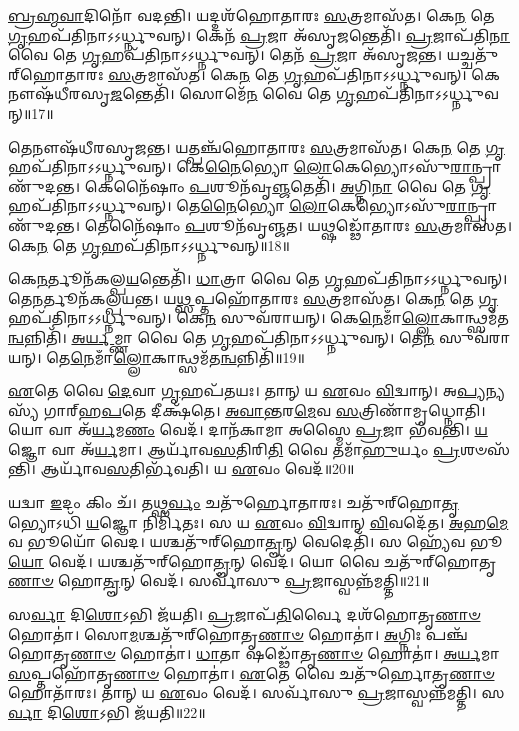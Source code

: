 \-\ul{𑌬𑍍𑌰}\-\-\ul{𑌹𑍍𑌮}\-\-\ul{𑌵𑌾}\-𑌦𑌿𑌨𑍋᳴ 𑌵𑌦𑌨𑍍𑌤𑌿।
𑌯𑌦𑍍𑌦𑌶᳴𑌹𑍋𑌤𑌾𑌰𑌃 \ul{𑌸}\-𑌤𑍍𑌰𑌮𑌾𑌸᳴𑌤।
𑌕𑍇\-\ul{𑌨} 𑌤𑍇 \ul{𑌗𑍃}\-𑌹𑌪᳴𑌤𑌿𑌨𑌾\-𑌽𑌽𑌰𑍍𑌧𑍍𑌨𑍁𑌵𑌨𑍍।
𑌕𑍇𑌨᳴ \ul{𑌪𑍍𑌰}\-𑌜𑌾 𑌅᳴𑌸𑍃\-\ul{𑌜}\-𑌨𑍍𑌤𑍇𑌤𑌿᳴।
\-\ul{𑌪𑍍𑌰}\-𑌜𑌾𑌪᳴𑌤𑌿\-\ul{𑌨𑌾} 𑌵𑍈 𑌤𑍇 \ul{𑌗𑍃}\-𑌹𑌪᳴𑌤𑌿𑌨𑌾\-𑌽𑌽𑌰𑍍𑌧𑍍𑌨𑍁𑌵𑌨𑍍।
𑌤𑍇𑌨᳴ \ul{𑌪𑍍𑌰}\-𑌜𑌾 𑌅᳴𑌸𑍃𑌜𑌨𑍍𑌤।
𑌯𑌚𑍍𑌚𑌤𑍁᳴𑌰𑍍‌\mbox{}𑌹𑍋𑌤𑌾𑌰𑌃 \ul{𑌸}\-𑌤𑍍𑌰𑌮𑌾𑌸᳴𑌤।
𑌕𑍇\-\ul{𑌨} 𑌤𑍇 \ul{𑌗𑍃}\-𑌹𑌪᳴𑌤𑌿𑌨𑌾\-𑌽𑌽𑌰𑍍𑌧𑍍𑌨𑍁𑌵𑌨𑍍।
𑌕𑍇𑌨𑍗𑌷᳴𑌧𑍀𑌰𑌸𑍃\-\ul{𑌜}\-𑌨𑍍𑌤𑍇𑌤𑌿᳴।
𑌸𑍋𑌮𑍇᳴\-\ul{𑌨} 𑌵𑍈 𑌤𑍇 \ul{𑌗𑍃}\-𑌹𑌪᳴𑌤𑌿𑌨𑌾\-𑌽𑌽𑌰𑍍𑌧𑍍𑌨𑍁𑌵𑌨𑍍॥17॥

𑌤𑍇𑌨𑍗𑌷᳴𑌧𑍀𑌰𑌸𑍃𑌜𑌨𑍍𑌤।
𑌯𑌤𑍍𑌪𑌞𑍍𑌚᳴𑌹𑍋𑌤𑌾𑌰𑌃 \ul{𑌸}\-𑌤𑍍𑌰𑌮𑌾𑌸᳴𑌤।
𑌕𑍇\-\ul{𑌨} 𑌤𑍇 \ul{𑌗𑍃}\-𑌹𑌪᳴𑌤𑌿𑌨𑌾\-𑌽𑌽𑌰𑍍𑌧𑍍𑌨𑍁𑌵𑌨𑍍।
𑌕𑍇\-\ul{𑌨𑍈}\-𑌭𑍍𑌯𑍋 \ul{𑌲𑍋}\-𑌕𑍇𑌭𑍍𑌯𑍋\-𑌽𑌸𑍁᳴\-\ul{𑌰𑌾}\-𑌨𑍍𑌪𑍍𑌰𑌾𑌣𑍁᳴𑌦𑌨𑍍𑌤।
𑌕𑍇𑌨𑍈᳴𑌷𑌾𑌂 \ul{𑌪}\-𑌶𑍂𑌨᳴𑌵𑍃\-\ul{𑌞𑍍𑌜}\-𑌤𑍇𑌤𑌿᳴।
\-\ul{𑌅}\-𑌗𑍍𑌨𑌿\-\ul{𑌨𑌾} 𑌵𑍈 𑌤𑍇 \ul{𑌗𑍃}\-𑌹𑌪᳴𑌤𑌿𑌨𑌾\-𑌽𑌽𑌰𑍍𑌧𑍍𑌨𑍁𑌵𑌨𑍍।
𑌤𑍇\-\ul{𑌨𑍈}\-𑌭𑍍𑌯𑍋 \ul{𑌲𑍋}\-𑌕𑍇𑌭𑍍𑌯𑍋\-𑌽𑌸𑍁᳴\-\ul{𑌰𑌾}\-𑌨𑍍𑌪𑍍𑌰𑌾𑌣𑍁᳴𑌦𑌨𑍍𑌤।
𑌤𑍇𑌨𑍈᳴𑌷𑌾𑌂 \ul{𑌪}\-𑌶𑍂𑌨᳴𑌵𑍃𑌞𑍍𑌜𑌤।
𑌯𑌥𑍍𑌷𑌡𑍍𑌢𑍋᳴𑌤𑌾𑌰𑌃 \ul{𑌸}\-𑌤𑍍𑌰𑌮𑌾𑌸᳴𑌤।
𑌕𑍇\-\ul{𑌨} 𑌤𑍇 \ul{𑌗𑍃}\-𑌹𑌪᳴𑌤𑌿𑌨𑌾\-𑌽𑌽𑌰𑍍𑌧𑍍𑌨𑍁𑌵𑌨𑍍॥18॥

𑌕𑍇\-\ul{𑌨}\-𑌰𑍍𑌤𑍂𑌨᳴𑌕𑌲𑍍𑌪\-\ul{𑌯}\-𑌨𑍍𑌤𑍇𑌤𑌿᳴।
\-\ul{𑌧𑌾}\-𑌤𑍍𑌰𑌾 𑌵𑍈 𑌤𑍇 \ul{𑌗𑍃}\-𑌹𑌪᳴𑌤𑌿𑌨𑌾\-𑌽𑌽𑌰𑍍𑌧𑍍𑌨𑍁𑌵𑌨𑍍।
𑌤𑍇\-\ul{𑌨}\-𑌰𑍍𑌤𑍂𑌨᳴𑌕𑌲𑍍𑌪𑌯𑌨𑍍𑌤।
𑌯\-\ul{𑌥𑍍𑌸}\-𑌪𑍍𑌤𑌹𑍋᳴𑌤𑌾𑌰𑌃 \ul{𑌸}\-𑌤𑍍𑌰𑌮𑌾𑌸᳴𑌤।
𑌕𑍇\-\ul{𑌨} 𑌤𑍇 \ul{𑌗𑍃}\-𑌹𑌪᳴𑌤𑌿𑌨𑌾\-𑌽𑌽𑌰𑍍𑌧𑍍𑌨𑍁𑌵𑌨𑍍।
𑌕𑍇\-\ul{𑌨} 𑌸𑍁𑌵᳴𑌰𑌾𑌯𑌨𑍍।
𑌕𑍇\-\ul{𑌨𑍇}\-𑌮𑌾𑌁\-\ul{𑌲𑍍𑌲𑍋}\-𑌕𑌾𑌨𑍍𑌥𑍍𑌸𑌮᳴\-𑌤\-\ul{𑌨𑍍𑌵}\-𑌨𑍍𑌨𑌿𑌤𑌿᳴।
\-\ul{𑌅}\-\-\ul{𑌰𑍍𑌯}\-𑌮𑍍𑌣𑌾 𑌵𑍈 𑌤𑍇 \ul{𑌗𑍃}\-𑌹𑌪᳴𑌤𑌿𑌨𑌾\-𑌽𑌽𑌰𑍍𑌧𑍍𑌨𑍁𑌵𑌨𑍍।
𑌤𑍇\-\ul{𑌨} 𑌸𑍁𑌵᳴𑌰𑌾𑌯𑌨𑍍।
𑌤𑍇\-\ul{𑌨𑍇}\-𑌮𑌾𑌁\-\ul{𑌲𑍍𑌲𑍋}\-𑌕𑌾𑌨𑍍𑌥𑍍𑌸𑌮᳴𑌤\-\ul{𑌨𑍍𑌵}\-𑌨𑍍𑌨𑌿𑌤𑌿᳴॥19॥

\-\ul{𑌏}\-𑌤𑍇 𑌵𑍈 \ul{𑌦𑍇}\-𑌵𑌾 \ul{𑌗𑍃}\-𑌹𑌪᳴𑌤𑌯𑌃।
𑌤𑌾𑌨𑍍 𑌯 \ul{𑌏}\-𑌵𑌂 \ul{𑌵𑌿}\-𑌦𑍍𑌵𑌾𑌨𑍍।
𑌅\-\ul{𑌪𑍍𑌯}\-𑌨𑍍𑌯𑌸𑍍𑌯᳴ 𑌗𑌾𑌰𑍍‌\mbox{}𑌹\-\ul{𑌪}\-𑌤𑍇 𑌦𑍀𑌕𑍍𑌷᳴𑌤𑍇।
\-\ul{𑌅}\-\-\ul{𑌵𑌾}\-\-\ul{𑌨𑍍𑌤}\-𑌰\-\ul{𑌮𑍇}\-𑌵 \ul{𑌸}\-𑌤𑍍𑌰𑌿𑌣𑌾᳴𑌮𑍃𑌧𑍍𑌨𑍋𑌤𑌿।
𑌯𑍋 𑌵𑌾 𑌅᳴\-\ul{𑌰𑍍𑌯}\-𑌮\-\ul{𑌣𑌂} 𑌵𑍇𑌦᳴।
𑌦𑌾𑌨᳴𑌕𑌾𑌮𑌾 𑌅𑌸𑍍𑌮𑍈 \ul{𑌪𑍍𑌰}\-𑌜𑌾 𑌭᳴𑌵𑌨𑍍𑌤𑌿।
\-\ul{𑌯}\-𑌜𑍍𑌞𑍋 𑌵𑌾 𑌅᳴\-\ul{𑌰𑍍𑌯}\-𑌮𑌾।
𑌆𑌰𑍍𑌯𑌾᳴𑌵\-\ul{𑌸}\-𑌤𑌿𑌰𑌿\-\ul{𑌤𑌿} 𑌵𑍈 𑌤𑌮𑌾᳴\-\ul{𑌹𑍁}\-𑌰𑍍𑌯𑌂 \ul{𑌪𑍍𑌰}\-𑌶𑍞𑌸᳴𑌨𑍍𑌤𑌿।
𑌆𑌰𑍍𑌯𑌾᳴𑌵\-\ul{𑌸}\-𑌤𑌿𑌰𑍍𑌭᳴𑌵𑌤𑌿।
𑌯 \ul{𑌏}\-𑌵𑌂 𑌵𑍇𑌦᳴॥20॥

𑌯𑌦𑍍𑌵𑌾 \ul{𑌇}\-𑌦𑌂 𑌕𑌿𑌂 𑌚᳴।
𑌤𑌥𑍍𑌸\-\ul{𑌰𑍍𑌵𑌂} 𑌚𑌤𑍁᳴𑌰𑍍\mbox{}𑌹𑍋𑌤𑌾𑌰𑌃।
𑌚𑌤𑍁᳴𑌰𑍍‌\mbox{}𑌹𑍋\-\ul{𑌤𑍃}\-𑌭𑍍𑌯𑍋𑌽𑌧𑌿᳴ \ul{𑌯}\-𑌜𑍍𑌞𑍋 𑌨𑌿𑌰𑍍𑌮𑌿᳴𑌤𑌃।
𑌸 𑌯 \ul{𑌏}\-𑌵𑌂 \ul{𑌵𑌿}\-𑌦𑍍𑌵𑌾𑌨𑍍‌ \ul{𑌵𑌿}\-𑌵𑌦𑍇᳴𑌤।
\-\ul{𑌅}\-𑌹\-\ul{𑌮𑍇}\-𑌵 𑌭𑍂𑌯𑍋᳴ 𑌵𑍇𑌦।
𑌯𑌶𑍍𑌚𑌤𑍁᳴𑌰𑍍‌\mbox{}𑌹𑍋\-\ul{𑌤𑍄}\-𑌨𑍍 𑌵𑍇𑌦𑍇𑌤𑌿᳴।
𑌸 𑌹𑍍𑌯𑍇᳴𑌵 𑌭𑍂\-\ul{𑌯𑍋} 𑌵𑍇𑌦᳴।
𑌯𑌶𑍍𑌚𑌤𑍁᳴𑌰𑍍‌\mbox{}𑌹𑍋\-\ul{𑌤𑍄}\-𑌨𑍍 𑌵𑍇𑌦᳴।
𑌯𑍋 𑌵𑍈 𑌚𑌤𑍁᳴𑌰𑍍‌\mbox{}𑌹𑍋𑌤𑍃\-\ul{𑌣𑌾}\-\-\ul{𑍞} 𑌹𑍋\-\ul{𑌤𑍄}\-𑌨𑍍 𑌵𑍇𑌦᳴।
𑌸𑌰𑍍𑌵𑌾᳴𑌸𑍁 \ul{𑌪𑍍𑌰}\-𑌜𑌾𑌸𑍍𑌵𑌨𑍍𑌨᳴𑌮𑌤𑍍𑌤𑌿॥21॥

𑌸\-\ul{𑌰𑍍𑌵𑌾} 𑌦𑌿\-\ul{𑌶𑍋}\-𑌽𑌭𑌿 𑌜᳴𑌯𑌤𑌿।
\-\ul{𑌪𑍍𑌰}\-𑌜𑌾𑌪᳴\-\ul{𑌤𑌿}\-𑌰𑍍𑌵𑍈 𑌦𑌶᳴𑌹𑍋𑌤𑍃\-\ul{𑌣𑌾}\-\-\ul{𑍞} 𑌹𑍋𑌤𑌾॑।
𑌸𑍋\-\ul{𑌮}\-𑌶𑍍𑌚𑌤𑍁᳴𑌰𑍍‌\mbox{}𑌹𑍋𑌤𑍃\-\ul{𑌣𑌾}\-\-\ul{𑍞} 𑌹𑍋𑌤𑌾॑।
\-\ul{𑌅}\-𑌗𑍍𑌨𑌿𑌃 𑌪𑌞𑍍𑌚᳴𑌹𑍋𑌤𑍃\-\ul{𑌣𑌾}\-\-\ul{𑍞} 𑌹𑍋𑌤𑌾॑।
\-\ul{𑌧𑌾}\-𑌤𑌾 𑌷𑌡𑍍𑌢𑍋᳴𑌤𑍃\-\ul{𑌣𑌾}\-\-\ul{𑍞} 𑌹𑍋𑌤𑌾॑।
\-\ul{𑌅}\-\-\ul{𑌰𑍍𑌯}\-𑌮𑌾 \ul{𑌸}\-𑌪𑍍𑌤𑌹𑍋᳴𑌤𑍃\-\ul{𑌣𑌾}\-\-\ul{𑍞} 𑌹𑍋𑌤𑌾॑।
\-\ul{𑌏}\-𑌤𑍇 𑌵𑍈 𑌚𑌤𑍁᳴𑌰𑍍\mbox{}𑌹𑍋𑌤𑍃\-\ul{𑌣𑌾}\-\-\ul{𑍞} 𑌹𑍋𑌤𑌾᳴𑌰𑌃।
𑌤𑌾𑌨𑍍 𑌯 \ul{𑌏}\-𑌵𑌂 𑌵𑍇𑌦᳴।
𑌸𑌰𑍍𑌵𑌾᳴𑌸𑍁 \ul{𑌪𑍍𑌰}\-𑌜𑌾𑌸𑍍𑌵𑌨𑍍𑌨᳴𑌮𑌤𑍍𑌤𑌿।
𑌸\-\ul{𑌰𑍍𑌵𑌾} 𑌦𑌿\-\ul{𑌶𑍋}\-𑌽𑌭𑌿 𑌜᳴𑌯𑌤𑌿॥22॥\anuvakamend[\-\ul{𑌆}\-\-\ul{𑌰𑍍𑌧𑍍𑌨𑍁}\-\-\ul{𑌵}\-\-\ul{𑌨𑍍𑌨𑌾}\-\-\ul{𑌰𑍍𑌧𑍍𑌨𑍁}\-\-\ul{𑌵}\-𑌨𑍍𑌨𑌿\-\ul{𑌤𑍍𑌯𑍇}\-𑌵𑌂 𑌵𑍇𑌦𑌾॑𑌤𑍍𑌤𑌿 𑌸\-\ul{𑌰𑍍𑌵𑌾} 𑌦𑌿\-\ul{𑌶𑍋}\-𑌽𑌭𑌿 𑌜᳴𑌯𑌤𑌿 (𑌵𑍈 𑌤𑍇𑌨᳴ \ul{𑌸}\-𑌤𑍍𑌰𑌙𑍍𑌕𑍇𑌨᳴॥)]

